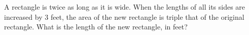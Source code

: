 A rectangle is twice as long as it is wide. When the lengths of all its sides are increased by $3$ feet, the area of the new rectangle is triple that of the original rectangle. What is the length of the new rectangle, in feet?

